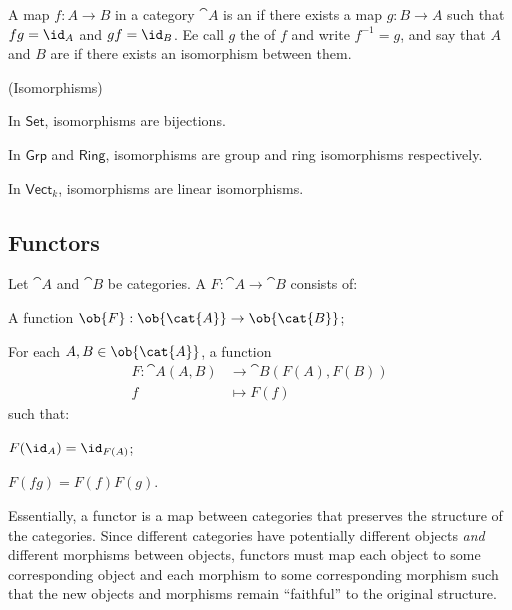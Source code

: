 \begin{definition}
  A map $f : A \to B$ in a category $\cat{A}$ is an  if there exists
  a map $g : B \to A$ such that $fg = \id_A$ and $gf = \id_B$.
  Ee call $g$ the  of $f$ and write $f^{-1} = g$,
  and say that $A$ and $B$ are 
  if there exists an isomorphism between them.

  \step
  \begin{examples} (Isomorphisms)
    \begin{enumarabic}
      \item In $\mathsf{Set}$, isomorphisms are bijections.
      \item In $\mathsf{Grp}$ and $\mathsf{Ring}$, isomorphisms are
        group and ring isomorphisms respectively.
      \item In $\mathsf{Vect}_k$, isomorphisms are linear isomorphisms.
    \end{enumarabic}
  \end{examples}
\end{definition}

\subsection{Functors}
\begin{definition}
  Let $\cat{A}$ and $\cat{B}$ be categories.
  A  $F : \cat{A} \to \cat{B}$ consists of:
  \begin{enumarabic}
    \item A function $\ob{F} : \ob{\cat{A}} \to \ob{\cat{B}}$;
    \item For each $A, B \in \ob{\cat{A}}$, a function
      \begin{align*}
        F : \cat{A}(A,B) &\to \cat{B}(F(A), F(B)) \\
        f &\mapsto F(f)
      \end{align*}
      such that:
      \begin{enumalph}
        \item $F(\id_A) = \id_{F(A)}$;
        \item $F(fg) = F(f)F(g)$.
      \end{enumalph}
  \end{enumarabic}
\end{definition}

Essentially, a functor is a map between categories that preserves
the structure of the categories.
Since different categories have potentially different objects
\emph{and} different morphisms between objects,
functors must map each object to some corresponding object
and each morphism to some corresponding morphism
such that the new objects and morphisms remain
``faithful'' to the original structure.

